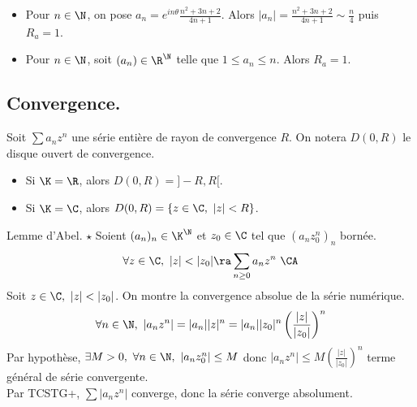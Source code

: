 \documentclass[11pt]{article}
\begin{document}
\vspace*{-0.8cm}

\begin{ex}{}{}
    \begin{itemize}
    \item Pour $n\in\N$, on pose $a_n=e^{in\theta}\frac{n^2+3n+2}{4n+1}$. Alors $|a_n|=\frac{n^2+3n+2}{4n+1}\sim\frac{n}{4}$ puis $R_a=1$.
    \item Pour $n\in\N$, soit $(a_n)\in\R^\N$ telle que $1 \leq a_n \leq n$. Alors $R_a = 1$.
    \end{itemize}
\end{ex}

\vspace*{-0.8cm}

\subsection{Convergence.}

\begin{defi}{}{}
    Soit $\sum a_nz^n$ une série entière de rayon de convergence $R$. On notera $D(0,R)$ le disque ouvert de convergence.
    \begin{itemize}
        \item Si $\K=\R$, alors $D(0,R)=]-R,R[$.
        \item Si $\K=\C$, alors $D(0,R)=\{z\in \C, ~ |z|<R\}$.
    \end{itemize}
\end{defi}

\vspace*{-0.8cm}

\begin{thm}{Lemme d'Abel. $\star$}{}
    Soient $(a_n)_n\in\K^\N$ et $z_0\in\C$ tel que $(a_nz_0^n)_n$ bornée.
    \begin{equation*}
        \forall z \in \C, ~ |z| < |z_0| \ra \sum_{n\geq0} a_nz^n ~ \CA
    \end{equation*}
    \tcblower
    Soit $z\in\C, ~ |z|<|z_0|$. On montre la convergence absolue de la série numérique.
    \begin{equation*}
        \forall n \in \N, ~ |a_nz^n| = |a_n||z|^n = |a_n||z_0|^n\left(\frac{|z|}{|z_0|}\right)^n
    \end{equation*}
    Par hypothèse, $\exists M > 0, ~ \forall n \in \N, ~ |a_nz_0^n| \leq M$ donc $|a_nz^n|\leq M\left( \frac{|z|}{|z_0|} \right)^n$ terme général de série convergente.\\
    Par TCSTG+, $\sum|a_nz^n|$ converge, donc la série converge absolument.
\end{thm}
\end{document}
